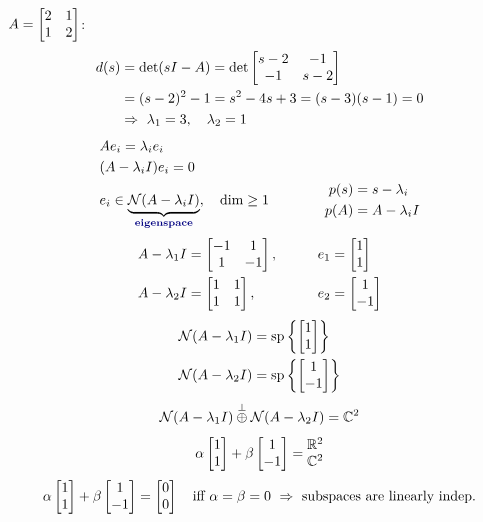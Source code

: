 \begin{example}
$A=\begin{bmatrix}2&1\\1&2\end{bmatrix}$:
\begin{align*}
d(s)&=\det(sI-A)=\det\begin{bmatrix}s-2&-1\\-1&s-2\end{bmatrix}\\
&=(s-2)^2-1=s^2-4s+3=(s-3)(s-1)=0\\
&\Rightarrow\ \lambda_1=3,\quad\lambda_2=1
\end{align*}
\begin{align*}
&Ae_i=\lambda_ie_i\\
&(A-\lambda_iI)e_i=0\\
&e_i\in\underbrace{\Null(A-\lambda_iI)}_{\text{\term{eigenspace}}},\quad\dim\geq1
\qquad\qquad
\begin{aligned}
p(s)&=s-\lambda_i\\
p(A)&=A-\lambda_iI
\end{aligned}
\end{align*}
\begin{alignat*}{2}
A-\lambda_1I&=\begin{bmatrix}-1&1\\1&-1\end{bmatrix},&\qquad e_1&=\begin{bmatrix}1\\1\end{bmatrix}\\
A-\lambda_2I&=\begin{bmatrix}1&1\\1&1\end{bmatrix},&\qquad e_2&=\begin{bmatrix}1\\-1\end{bmatrix}
\end{alignat*}
\begin{align*}
\mathcal{N}(A-\lambda_1I)&=\operatorname{sp}\left\{\begin{bmatrix}1\\1\end{bmatrix}\right\}\\
\mathcal{N}(A-\lambda_2I)&=\operatorname{sp}\left\{\begin{bmatrix}1\\-1\end{bmatrix}\right\}
\end{align*}
\[
\mathcal{N}(A-\lambda_1I)\overset{\perp}{\oplus}\mathcal{N}(A-\lambda_2I)=\mathbb{C}^2
\]
\[
\alpha\begin{bmatrix}1\\1\end{bmatrix}+\beta\begin{bmatrix}1\\-1\end{bmatrix}=\begin{matrix}\mathbb{R}^2\\\mathbb{C}^2\end{matrix}
\]
\[
\alpha\begin{bmatrix}1\\1\end{bmatrix}+\beta\begin{bmatrix}1\\-1\end{bmatrix}=\begin{bmatrix}0\\0\end{bmatrix}\quad\text{iff }\alpha=\beta=0
\ \Rightarrow\ \text{subspaces are linearly indep.}
\]
\end{example}

